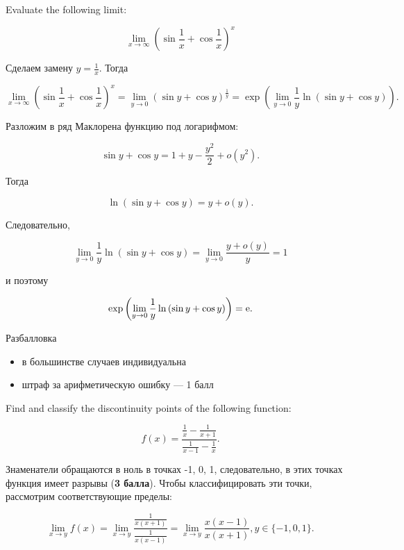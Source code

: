 \documentclass[addpoints, answers]{exam} %
\begin{document}
\begin{questions}


\question[10] Evaluate the following limit:

\[\lim_{x \to \infty} \left( \sin \frac{1}{x} + \cos \frac{1}{x} \right)^x\]

\begin{solution}

Сделаем замену $y=\frac{1}{x}$. Тогда

\[\lim_{x \to \infty} \left( \sin \frac{1}{x} + \cos \frac{1}{x} \right)^x = \lim_{y \to 0} \left( \sin y + \cos y \right)^\frac{1}{y} = \exp \left( \lim_{y \to 0} \frac{1}{y} \ln \left( \sin y + \cos y \right) \right). \]

Разложим в ряд Маклорена функцию под логарифмом:

\[ \sin y + \cos y = 1+y-\frac{y^2}{2} + o(y^2).\]

Тогда

\[ \ln \left( \sin y + \cos y \right) = y+o(y). \]

Следовательно,

\[ \lim_{y \to 0} \frac{1}{y} \ln \left( \sin y + \cos y \right) = \lim_{y \to 0} \frac{y+o(y)}{y} =1 \]

и поэтому

\[ \exp \left( \lim_{y \to 0} \frac{1}{y} \ln \left( \sin y + \cos y \right) \right) ={\rm e}. \]


Разбалловка
\begin{itemize}
\item в большинстве случаев индивидуальна
\item штраф за арифметическую ошибку --- 1 балл
\end{itemize}

\end{solution}

\question[10] Find and classify the discontinuity points of the following function:

\[
f(x) = \frac{\frac{1}{x}-\frac{1}{x+1}}{\frac{1}{x-1}-\frac{1}{x}}.
\]

\begin{solution}

Знаменатели обращаются в ноль в точках -1, 0, 1, следовательно, в этих точках функция имеет разрывы (\textbf{3 балла}). Чтобы классифицировать эти точки, рассмотрим соответствующие пределы:

\[ \lim_{x \to y} f(x) = \lim_{x \to y} \frac{\frac{1}{x (x+1)}}{\frac{1}{x(x-1)}} = \lim_{x \to y} \frac{x (x-1)}{x (x+1)}, y \in \{-1,0,1\}.\]


\end{solution}
\end{questions}
\end{document}
